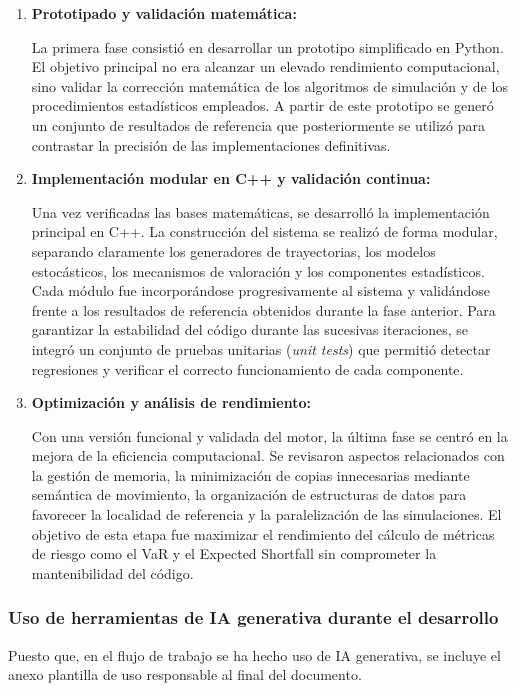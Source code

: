 \documentclass[11pt]{article}
\begin{document}
\begin{enumerate}
\item \textbf{Prototipado y validación matemática:}

La primera fase consistió en desarrollar un prototipo simplificado en Python. El objetivo principal no era alcanzar un elevado rendimiento computacional, sino validar la corrección matemática de los algoritmos de simulación y de los procedimientos estadísticos empleados. A partir de este prototipo se generó un conjunto de resultados de referencia que posteriormente se utilizó para contrastar la precisión de las implementaciones definitivas.

\item \textbf{Implementación modular en C++ y validación continua:}

Una vez verificadas las bases matemáticas, se desarrolló la implementación principal en C++. La construcción del sistema se realizó de forma modular, separando claramente los generadores de trayectorias, los modelos estocásticos, los mecanismos de valoración y los componentes estadísticos. Cada módulo fue incorporándose progresivamente al sistema y validándose frente a los resultados de referencia obtenidos durante la fase anterior. Para garantizar la estabilidad del código durante las sucesivas iteraciones, se integró un conjunto de pruebas unitarias (\textit{unit tests}) que permitió detectar regresiones y verificar el correcto funcionamiento de cada componente.

\item \textbf{Optimización y análisis de rendimiento:}

Con una versión funcional y validada del motor, la última fase se centró en la mejora de la eficiencia computacional. Se revisaron aspectos relacionados con la gestión de memoria, la minimización de copias innecesarias mediante semántica de movimiento, la organización de estructuras de datos para favorecer la localidad de referencia y la paralelización de las simulaciones. El objetivo de esta etapa fue maximizar el rendimiento del cálculo de métricas de riesgo como el VaR y el Expected Shortfall sin comprometer la mantenibilidad del código.

\end{enumerate}

\subsubsection*{Uso de herramientas de IA generativa durante el desarrollo}
Puesto que, en el flujo de trabajo se ha hecho uso de IA generativa, se incluye el anexo plantilla de uso responsable al final del documento.
\end{document}

